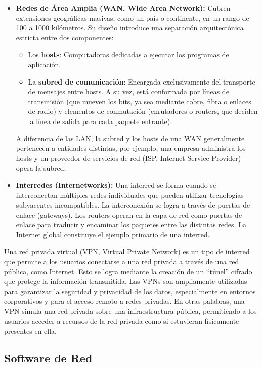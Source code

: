 \begin{itemize}
  \item \textbf{Redes de Área Amplia (WAN, Wide Area Network):} 
  Cubren extensiones geográficas masivas, como un país o continente, en un rango de 100 a 1000 kilómetros. Su diseño introduce una separación arquitectónica estricta entre dos componentes:
  \begin{itemize}
    \item Los \textbf{hosts}: Computadoras dedicadas a ejecutar los programas de aplicación.
    \item La \textbf{subred de comunicación}: Encargada exclusivamente del transporte de mensajes entre hosts. A su vez, está conformada por líneas de transmisión (que mueven los bits, ya sea mediante cobre, fibra o enlaces de radio) y elementos de conmutación (enrutadores o routers, que deciden la línea de salida para cada paquete entrante).
  \end{itemize}
  A diferencia de las LAN, la subred y los hosts de una WAN generalmente pertenecen a entidades distintas, por ejemplo, una empresa administra los hosts y un proveedor de servicios de red (ISP, Internet Service Provider) opera la subred.

  \item \textbf{Interredes (Internetworks):} 
  Una interred se forma cuando se interconectan múltiples redes individuales que pueden utilizar tecnologías subyacentes incompatibles. La interconexión se logra a través de puertas de enlace (gateways). Los routers operan en la capa de red como puertas de enlace para traducir y encaminar los paquetes entre las distintas redes. La Internet global constituye el ejemplo primario de una interred.
\end{itemize}

\begin{obs}[VPNs]
Una red privada virtual (VPN, Virtual Private Network) es un tipo de interred que permite a los usuarios conectarse a una red privada a través de una red pública, como Internet. Esto se logra mediante la creación de un ``túnel'' cifrado que protege la información transmitida. Las VPNs son ampliamente utilizadas para garantizar la seguridad y privacidad de los datos, especialmente en entornos corporativos y para el acceso remoto a redes privadas. En otras palabras, una VPN simula una red privada sobre una infraestructura pública, permitiendo a los usuarios acceder a recursos de la red privada como si estuvieran físicamente presentes en ella.
\end{obs}

\subsection{Software de Red}

